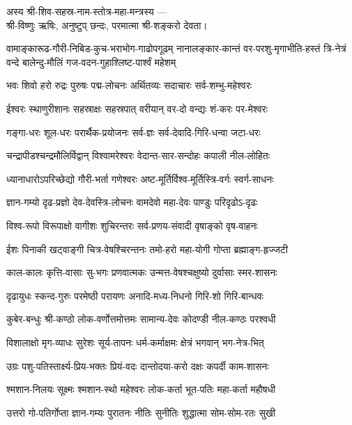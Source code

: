 अस्य श्री-शिव-सहस्र-नाम-स्तोत्र-महा-मन्त्रस्य \textsf{---}\\
श्री-विष्णुः ऋषिः, अनुष्टुप् छन्दः, परमात्मा श्री-शङ्करो देवता।


{वामाङ्कारूढ-गौरी-निबिड-कुच-भराभोग-गाढोपगूढम्}
{नानालङ्कार-कान्तं वर-परशु-मृगाभीति-हस्तं त्रि-नेत्रं}
{वन्दे बालेन्दु-मौलिं गज-वदन-गुहाश्लिष्ट-पार्श्वं महेशम्}

\twolineshloka
{भवः शिवो हरो रुद्रः पुरुषः पद्म-लोचनः}
{अर्थितव्यः सदाचारः सर्व-शम्भु-महेश्वरः}

\twolineshloka
{ईश्वरः स्थाणुरीशानः सहस्राक्षः सहस्रपात्}
{वरीयान् वर-दो वन्द्यः शं-करः पर-मेश्वरः}

\twolineshloka
{गङ्गा-धरः शूल-धरः परार्थैक-प्रयोजनः}
{सर्व-ज्ञः सर्व-देवादि-गिरि-धन्वा जटा-धरः}

\twolineshloka
{चन्द्रापीडश्चन्द्रमौलिर्विद्वान् विश्वामरेश्वरः}
{वेदान्त-सार-सन्दोहः कपाली नील-लोहितः}

\twolineshloka
{ध्यानाधारोऽपरिच्छेद्यो गौरी-भर्ता गणेश्वरः}
{अष्ट-मूर्तिर्विश्व-मूर्तिस्त्रि-वर्गः स्वर्ग-साधनः}

\twolineshloka
{ज्ञान-गम्यो दृढ-प्रज्ञो देव-देवस्त्रि-लोचनः}
{वामदेवो महा-देवः पाण्डुः परिदृढोऽ-दृढः}

\twolineshloka
{विश्व-रूपो विरूपाक्षो वागीशः शुचिरन्तरः}
{सर्व-प्रणय-संवादी वृषाङ्को वृष-वाहनः}

\twolineshloka
{ईशः पिनाकी खट्वाङ्गी चित्र-वेषश्चिरन्तनः}
{तमो-हरो महा-योगी गोप्ता ब्रह्माङ्ग-हृज्जटी}

\twolineshloka
{काल-कालः कृत्ति-वासाः सु-भगः प्रणवात्मकः}
{उन्मत्त-वेषश्चक्षुष्यो दुर्वासाः स्मर-शासनः}

\twolineshloka
{दृढायुधः स्कन्द-गुरुः परमेष्ठी परायणः}
{अनादि-मध्य-निधनो गिरि-शो गिरि-बान्धवः}

\twolineshloka
{कुबेर-बन्धुः श्री-कण्ठो लोक-वर्णोत्तमोत्तमः}
{सामान्य-देवः कोदण्डी नील-कण्ठः परश्वधी}

\twolineshloka
{विशालाक्षो मृग-व्याधः सुरेशः सूर्य-तापनः}
{धर्म-कर्माक्षमः क्षेत्रं भगवान् भग-नेत्र-भित्}

\twolineshloka
{उग्रः पशु-पतिस्तार्क्ष्य-प्रिय-भक्तः प्रियं-वदः}
{दान्तोदया-करो दक्षः कपर्दी काम-शासनः}

\twolineshloka
{श्मशान-निलयः सूक्ष्मः श्मशान-स्थो महेश्वरः}
{लोक-कर्ता भूत-पतिः महा-कर्ता महौषधी}

\twolineshloka
{उत्तरो गो-पतिर्गोप्ता ज्ञान-गम्यः पुरातनः}
{नीतिः सुनीतिः शुद्धात्मा सोम-सोम-रतः सुखी}


